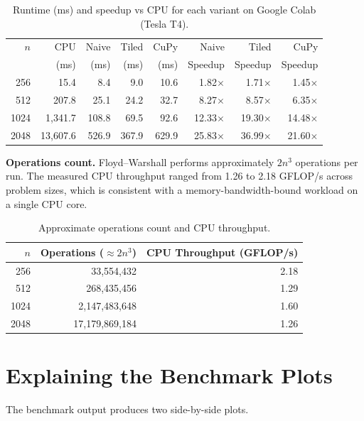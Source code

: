 \documentclass[11pt]{article}
\begin{document}
\begin{table}[h]
\centering
\caption{Runtime (ms) and speedup vs CPU for each variant on Google Colab (Tesla T4).}
\label{tab:results}
\begin{tabular}{r|rrrr|rrr}
\toprule
$n$ & CPU & Naive & Tiled & CuPy & Naive & Tiled & CuPy \\
    & (ms) & (ms) & (ms) & (ms) & Speedup & Speedup & Speedup \\
\midrule
256  & 15.4 & 8.4 & 9.0 & 10.6 & 1.82$\times$ & 1.71$\times$ & 1.45$\times$ \\
512  & 207.8 & 25.1 & 24.2 & 32.7 & 8.27$\times$ & 8.57$\times$ & 6.35$\times$ \\
1024 & 1,341.7 & 108.8 & 69.5 & 92.6 & 12.33$\times$ & 19.30$\times$ & 14.48$\times$ \\
2048 & 13,607.6 & 526.9 & 367.9 & 629.9 & 25.83$\times$ & 36.99$\times$ & 21.60$\times$ \\
\bottomrule
\end{tabular}
\end{table}

\textbf{Operations count.} Floyd--Warshall performs approximately $2n^3$ operations per run. The measured CPU throughput ranged from 1.26 to 2.18 GFLOP/s across problem sizes, which is consistent with a memory-bandwidth-bound workload on a single CPU core.

\begin{table}[h]
\centering
\caption{Approximate operations count and CPU throughput.}
\begin{tabular}{r|r|r}
\toprule
$n$ & Operations ($\approx 2n^3$) & CPU Throughput (GFLOP/s) \\
\midrule
256  & 33,554,432 & 2.18 \\
512  & 268,435,456 & 1.29 \\
1024 & 2,147,483,648 & 1.60 \\
2048 & 17,179,869,184 & 1.26 \\
\bottomrule
\end{tabular}
\end{table}

\section{Explaining the Benchmark Plots}

The benchmark output produces two side-by-side plots.
\end{document}
